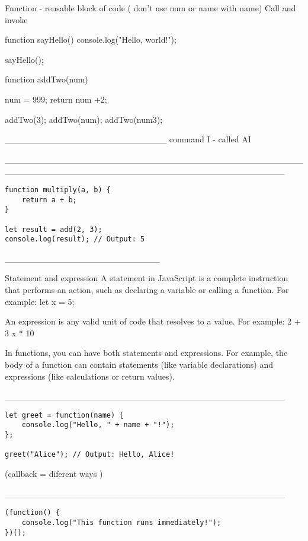 Function - reusable block of code
( don't use num or name with name)
 Call and invoke

function sayHello() {
    console.log("Hello, world!");
}

sayHello();

 function addTwo(num) {
    num = 999; 
    return num +2;

 }

 addTwo(3);
 addTwo(num);
 addTwo(num3);

__________________________
 command I - called AI

_____________________________________________________________________________________________



\begin{verbatim}
function multiply(a, b) {
    return a + b;
}

let result = add(2, 3);
console.log(result); // Output: 5
\end{verbatim}
_________________________

Statement and expression
A statement in JavaScript is a complete instruction that performs an action, such as declaring a variable or calling a function. For example:
let x = 5;

An expression is any valid unit of code that resolves to a value. For example:
2 + 3
x * 10

In functions, you can have both statements and expressions. For example, the body of a function can contain statements (like variable declarations) and expressions (like calculations or return values).

_____________________________________________


\begin{verbatim}
let greet = function(name) {
    console.log("Hello, " + name + "!");
};

greet("Alice"); // Output: Hello, Alice!
\end{verbatim}

(callback = diferent ways )

_____________________________________________


\begin{verbatim}
(function() {
    console.log("This function runs immediately!");
})();
\end{verbatim}

